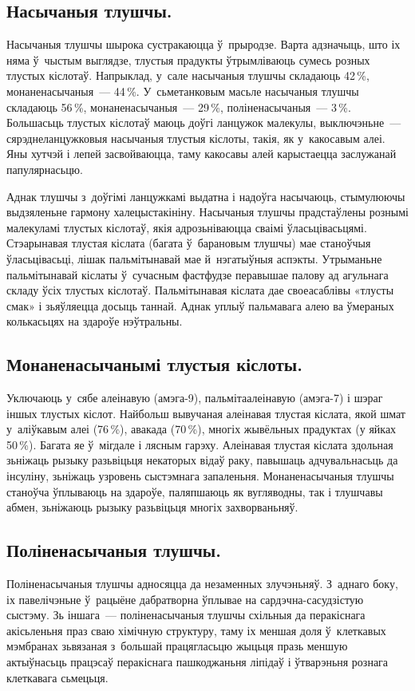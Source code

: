 \subsection{Насычаныя тлушчы.}
Насычаныя тлушчы шырока сустракаюцца ў~прыродзе. Варта адзначыць, што іх няма ў~чыстым выглядзе, тлустыя прадукты ўтрымліваюць сумесь розных тлустых кіслотаў. Напрыклад, у~сале насычаныя тлушчы складаюць 42\,\%, монаненасычаныя~--- 44\,\%. У~сьметанковым масьле насычаныя тлушчы складаюць 56\,\%, монаненасычаныя~--- 29\,\%, поліненасычаныя~--- 3\,\%. Большасьць тлустых кіслотаў маюць доўгі ланцужок малекулы, выключэньне~--- сярэднеланцужковыя насычаныя тлустыя кіслоты, такія, як у~какосавым алеі. Яны хутчэй і лепей засвойваюцца, таму какосавы алей карыстаецца заслужанай папулярнасьцю.

Аднак тлушчы з~доўгімі ланцужкамі выдатна і надоўга насычаюць, стымулюючы выдзяленьне гармону халецыстакініну. Насычаныя тлушчы прадстаўлены рознымі малекуламі тлустых кіслотаў, якія адрозьніваюцца сваімі ўласьцівасьцямі. Стэарынавая тлустая кіслата (багата ў~барановым тлушчы) мае станоўчыя ўласьцівасьці, лішак пальмітынавай мае й~нэгатыўныя аспэкты. Утрыманьне пальмітынавай кіслаты ў~сучасным фастфудзе перавышае палову ад агульнага складу ўсіх тлустых кіслотаў. Пальмітынавая кіслата дае своеасаблівы «тлусты смак» і зьяўляецца досыць таннай. Аднак уплыў пальмавага алею ва ўмераных колькасьцях на здароўе нэўтральны.

\subsection{Монаненасычанымі тлустыя кіслоты.}
Уключаюць у~сябе алеінавую (амэга-9), пальмітаалеінавую (амэга-7) і шэраг іншых тлустых кіслот. Найбольш вывучаная алеінавая тлустая кіслата, якой шмат у~аліўкавым алеі (76\,\%), авакада (70\,\%), многіх жывёльных прадуктах (у яйках 50\,\%). Багата яе ў~мігдале і лясным гарэху. Алеінавая тлустая кіслата здольная зьніжаць рызыку разьвіцьця некаторых відаў раку, павышаць адчувальнасьць да інсуліну, зьніжаць узровень сыстэмнага запаленьня. Монаненасычаныя тлушчы станоўча ўплываюць на здароўе, паляпшаюць як вугляводны, так і тлушчавы абмен, зьніжаюць рызыку разьвіцьця многіх захворваньняў.

\subsection{Поліненасычаныя тлушчы.}
Поліненасычаныя тлушчы адносяцца да незаменных злучэньняў. З~аднаго боку, іх павелічэньне ў~рацыёне дабратворна ўплывае на сардэчна-сасудзістую сыстэму. Зь іншага~--- поліненасычаныя тлушчы схільныя да перакіснага акісьленьня праз сваю хімічную структуру, таму іх меншая доля ў~клеткавых мэмбранах зьвязаная з~большай працягласьцю жыцьця празь меншую актыўнасьць працэсаў перакіснага пашкоджаньня ліпідаў і ўтварэньня рознага клеткавага сьмецьця.

